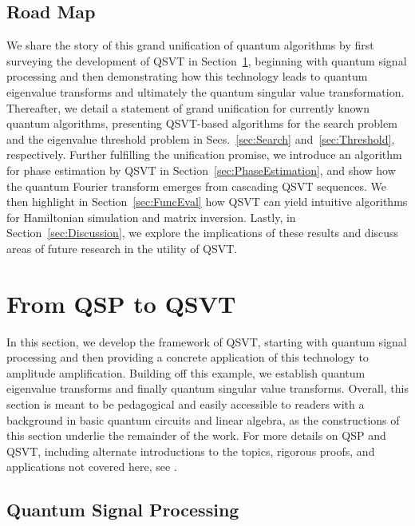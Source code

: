 \documentclass[aps,pra,showpacs,notitlepage,twocolumn,superscriptaddress,nofootinbib]{revtex4-1}
\begin{document}
    
    \subsection{Road Map}
        
    We share the story of this grand unification of quantum algorithms by first surveying the development of QSVT in Section~\ref{sec:QSP_To_QSVT}, beginning with quantum signal processing and then demonstrating how this technology leads to quantum eigenvalue transforms and ultimately the quantum singular value transformation. Thereafter, we detail a statement of grand unification for currently known quantum algorithms, presenting QSVT-based algorithms for the search problem and the eigenvalue threshold problem in Secs.~\ref{sec:Search} and~\ref{sec:Threshold}, respectively. Further fulfilling the unification promise, we introduce an algorithm for phase estimation by QSVT in Section~\ref{sec:PhaseEstimation}, and show how the quantum Fourier transform emerges from cascading QSVT sequences. We then highlight in Section~\ref{sec:FuncEval} how QSVT can yield intuitive algorithms for Hamiltonian simulation and matrix inversion. Lastly, in Section~\ref{sec:Discussion}, we explore the implications of these results and discuss areas of future research in the utility of QSVT.
        

    
        
\section{From QSP to QSVT} \label{sec:QSP_To_QSVT}

    In this section, we develop the framework of QSVT, starting with quantum signal processing and then providing a concrete application of this technology to amplitude amplification. Building off this example, we establish quantum eigenvalue transforms and finally quantum singular value transforms. Overall, this section is meant to be pedagogical and easily accessible to readers with a background in basic quantum circuits and linear algebra, as the constructions of this section underlie the remainder of the work. For more details on QSP and QSVT, including alternate introductions to the topics, rigorous proofs, and applications not covered here, see \cite{low2017quantum, Low_2016, gilyen2019quantum, Gily_n_2019}.


\subsection{Quantum Signal Processing}
\label{sec:qsp}
\end{document}
